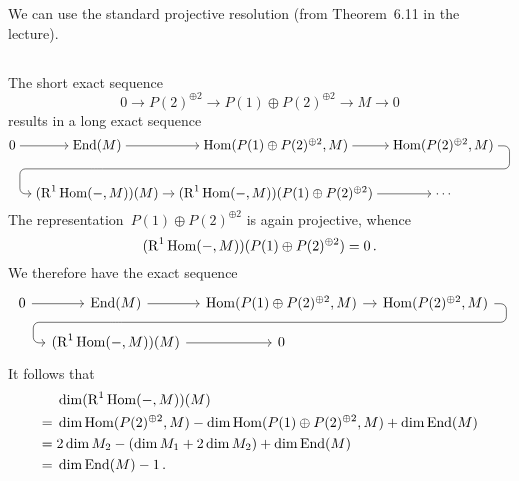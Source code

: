 \section{}





\subsection{}

We can use the standard projective resolution (from Theorem~6.11 in the lecture).





\subsection{}

The short exact sequence
\[
  0
  \to
  P(2)^{\oplus 2}
  \to
  P(1) \oplus P(2)^{\oplus 2}
  \to
  M
  \to
  0
\]
results in a long exact sequence
\[
  \begin{tikzcd}[column sep = 0.9em, cramped]
      0
      \arrow{r}
    & \End(M)
      \arrow{r}
      \arrow[d, phantom, ""{coordinate, name=Z}]
    & \Hom(P(1) \oplus P(2)^{\oplus 2}, M)
      \arrow{r}
    & \Hom(P(2)^{\oplus 2}, M)
      \arrow[ dll,
              rounded corners,
              to path={ -- ([xshift=2ex]\tikztostart.east)
                        |- (Z) \tikztonodes
                        -| ([xshift=-2ex]\tikztotarget.west)
                        -- (\tikztotarget)}
            ]
    \\
      {}
    & (\Right^1 \Hom(-,M))(M)
      \arrow{r}
    & (\Right^1 \Hom(-,M))(P(1) \oplus P(2)^{\oplus 2})
      \arrow{r}
    & \cdots
  \end{tikzcd}
\]
The representation~$P(1) \oplus P(2)^{\oplus 2}$ is again projective, whence
\[
  (\operatorname{R}^1 \operatorname{Hom}(-,M))(P(1) \oplus P(2)^{\oplus 2})
  =
  0 \,.
\]
We therefore have the exact sequence
\[
  \begin{tikzcd}[column sep = 1em, row sep = small]
      0
      \arrow{r}
    & \End(M)
      \arrow{r}
      \arrow[d, phantom, ""{coordinate, name=Z1}]
    & \Hom(P(1) \oplus P(2)^{\oplus 2}, M)
      \arrow{r}
    & \Hom(P(2)^{\oplus 2}, M)
      \arrow[ dll,
              rounded corners,
              to path={ -- ([xshift=2ex]\tikztostart.east)
                        |- (Z1) \tikztonodes
                        -| ([xshift=-2ex]\tikztotarget.west)
                        -- (\tikztotarget)}
            ]
    \\
      {}
    & (\Right^1 \Hom(-,M))(M)
      \arrow{r}
    & 0
    & {}
  \end{tikzcd}
\]
It follows that
\begin{align*}
  {}&
  \dim (\operatorname{R}^1 \operatorname{Hom}(-,M))(M)
  \\
  ={}&
  \dim \operatorname{Hom}(P(2)^{\oplus 2}, M)
  -
  \dim \operatorname{Hom}(P(1) \oplus P(2)^{\oplus 2}, M)
  +
  \dim
  \operatorname{End}(M)
  \\
  ={}&
  2 \dim M_2
  -
  (\dim M_1 + 2 \dim M_2)
  +
  \dim \operatorname{End}(M)
  \\
  ={}&
  \dim \operatorname{End}(M) - 1 \,.
\end{align*}


